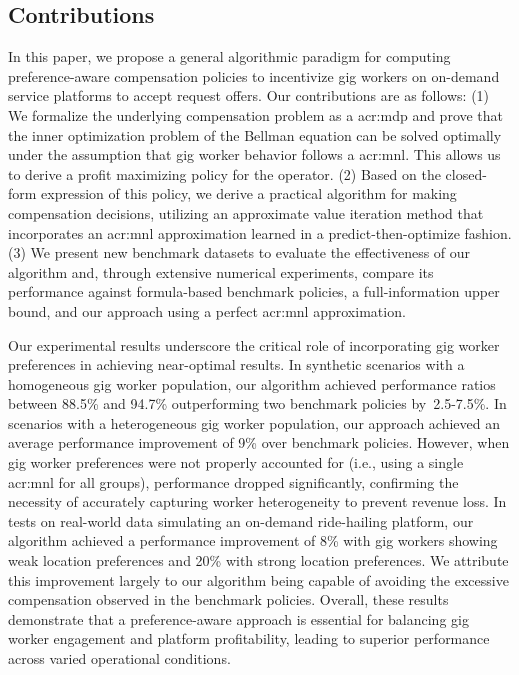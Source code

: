 \subsection{Contributions}

In this paper, we propose a general algorithmic paradigm for computing preference-aware compensation policies to incentivize gig workers on on-demand service platforms to accept request offers. Our contributions are as follows: (1) We formalize the underlying compensation problem as a \gls{acr:mdp} and prove that the inner optimization problem of the Bellman equation can be solved optimally under the assumption that gig worker behavior follows a \gls{acr:mnl}. This allows us to derive a profit maximizing policy for the operator. (2) Based on the closed-form expression of this policy, we derive a practical algorithm for making compensation decisions, utilizing an approximate value iteration method that incorporates an \gls{acr:mnl} approximation learned in a predict-then-optimize fashion. (3) We present new benchmark datasets to evaluate the effectiveness of our algorithm and, through extensive numerical experiments, compare its performance against formula-based benchmark policies, a full-information upper bound, and our approach using a perfect \gls{acr:mnl} approximation.

Our experimental results underscore the critical role of incorporating gig worker preferences in achieving near-optimal results. In synthetic scenarios with a homogeneous gig worker population, our algorithm achieved performance ratios between 88.5\% and 94.7\% outperforming two benchmark policies by~\mbox{2.5-7.5\%}. In scenarios with a heterogeneous gig worker population, our approach achieved an average performance improvement of 9\% over benchmark policies. However, when gig worker preferences were not properly accounted for (i.e., using a single \gls{acr:mnl} for all groups), performance dropped significantly, confirming the necessity of accurately capturing worker heterogeneity to prevent revenue loss. In tests on real-world data simulating an on-demand ride-hailing platform, our algorithm achieved a performance improvement of 8\% with gig workers showing weak location preferences and 20\% with strong location preferences. We attribute this improvement largely to our algorithm being capable of avoiding the excessive compensation observed in the benchmark policies. Overall, these results demonstrate that a preference-aware approach is essential for balancing gig worker engagement and platform profitability, leading to superior performance across varied operational conditions.

